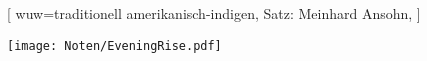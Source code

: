 [
    wuw={traditionell amerikanisch-indigen, Satz: Meinhard Ansohn},
]

\beginverse
\endverse
\texttt{[image: Noten/EveningRise.pdf]}

\endsong

